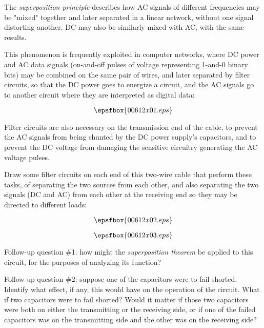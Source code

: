 

The {\it superposition principle} describes how AC signals of different frequencies may be "mixed" together and later separated in a linear network, without one signal distorting another.  DC may also be similarly mixed with AC, with the same results.

This phenomenon is frequently exploited in computer networks, where DC power and AC data signals (on-and-off pulses of voltage representing 1-and-0 binary bits) may be combined on the same pair of wires, and later separated by filter circuits, so that the DC power goes to energize a circuit, and the AC signals go to another circuit where they are interpreted as digital data:

$$\epsfbox{00612x01.eps}$$

Filter circuits are also necessary on the transmission end of the cable, to prevent the AC signals from being shunted by the DC power supply's capacitors, and to prevent the DC voltage from damaging the sensitive circuitry generating the AC voltage pulses.

Draw some filter circuits on each end of this two-wire cable that perform these tasks, of separating the two sources from each other, and also separating the two signals (DC and AC) from each other at the receiving end so they may be directed to different loads:

$$\epsfbox{00612x02.eps}$$







$$\epsfbox{00612x03.eps}$$

\vskip 10pt

Follow-up question \#1: how might the {\it superposition theorem} be applied to this circuit, for the purposes of analyzing its function?

\vskip 10pt

Follow-up question \#2: suppose one of the capacitors were to fail shorted.  Identify what effect, if any, this would have on the operation of the circuit.  What if two capacitors were to fail shorted?  Would it matter if those two capacitors were both on either the transmitting or the receiving side, or if one of the failed capacitors was on the transmitting side and the other was on the receiving side?

